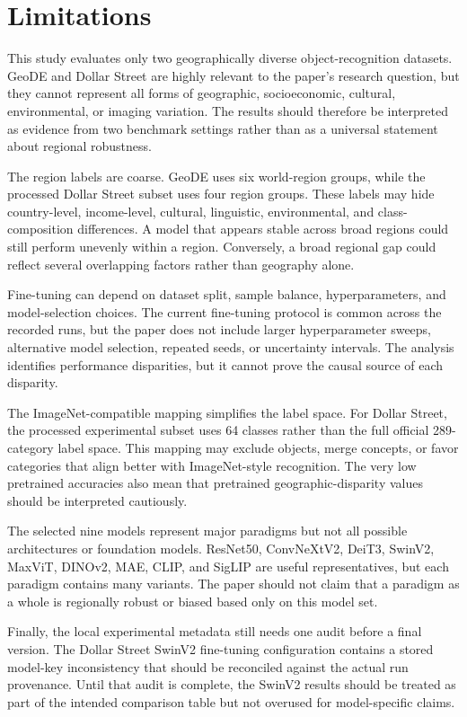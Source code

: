 \section{Limitations}

This study evaluates only two geographically diverse object-recognition datasets. GeoDE and Dollar Street are highly relevant to the paper's research question, but they cannot represent all forms of geographic, socioeconomic, cultural, environmental, or imaging variation. The results should therefore be interpreted as evidence from two benchmark settings rather than as a universal statement about regional robustness.

The region labels are coarse. GeoDE uses six world-region groups, while the processed Dollar Street subset uses four region groups. These labels may hide country-level, income-level, cultural, linguistic, environmental, and class-composition differences. A model that appears stable across broad regions could still perform unevenly within a region. Conversely, a broad regional gap could reflect several overlapping factors rather than geography alone.

Fine-tuning can depend on dataset split, sample balance, hyperparameters, and model-selection choices. The current fine-tuning protocol is common across the recorded runs, but the paper does not include larger hyperparameter sweeps, alternative model selection, repeated seeds, or uncertainty intervals. The analysis identifies performance disparities, but it cannot prove the causal source of each disparity.

The ImageNet-compatible mapping simplifies the label space. For Dollar Street, the processed experimental subset uses 64 classes rather than the full official 289-category label space. This mapping may exclude objects, merge concepts, or favor categories that align better with ImageNet-style recognition. The very low pretrained accuracies also mean that pretrained geographic-disparity values should be interpreted cautiously.

The selected nine models represent major paradigms but not all possible architectures or foundation models. ResNet50, ConvNeXtV2, DeiT3, SwinV2, MaxViT, DINOv2, MAE, CLIP, and SigLIP are useful representatives, but each paradigm contains many variants. The paper should not claim that a paradigm as a whole is regionally robust or biased based only on this model set.

Finally, the local experimental metadata still needs one audit before a final version. The Dollar Street SwinV2 fine-tuning configuration contains a stored model-key inconsistency that should be reconciled against the actual run provenance. Until that audit is complete, the SwinV2 results should be treated as part of the intended comparison table but not overused for model-specific claims.
